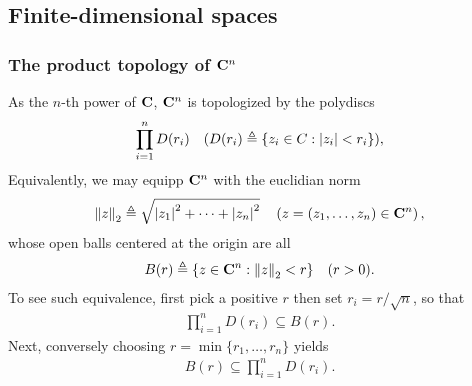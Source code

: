 \subsection{Finite-dimensional spaces}\label{notations: vector spaces: finite-dimensional vector spaces}%
%
%
\subsubsection{The product topology of $\C^n$}\label{notations: vector spaces: finite-dimensional vector spaces: the product topology of Cn}
%
As the $n$-th power of $\C$, $\C^n$ is topologized by the polydiscs %
\begin{align}
  \prod_{i=1}^{n} D(r_i) \quad (D(r_i) \Def \set{z_i \in C}{\magnitude{z_i} < r_i}), %
\end{align}
Equivalently, we may equipp $\C^n$ with the euclidian norm %
\begin{align}
  \norma{2}{z} \Def \sqrt{\magnitude{z_1}^2 + \cdots + \magnitude{z_n}^2} \quad \left(z = (z_1, \dots, z_n) \in \C^n\right), 
\end{align}
%
whose open balls centered at the origin are all %
\begin{align}
  B(r) \Def \set{z\in \C^n}{\norma{2}{z} < r} \quad (r > 0).
\end{align}
To see such equivalence, first pick a positive $r$ then set $r_i = r/\sqrt{n}$, so that %
\begin{align}
\prod_{i=1}^{n} D(r_i) \subseteq B(r). 
\end{align}
%
Next, conversely choosing $r = \min\{r_1, \dots, r_n\}$ yields %
\begin{align}
   B(r) \subseteq \prod_{i=1}^{n} D(r_i) .
\end{align}
%
